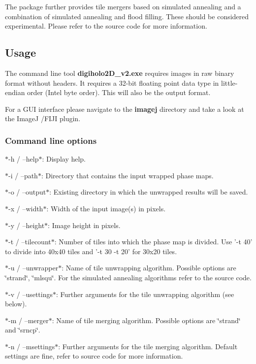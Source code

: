 The package further provides tile mergers based on simulated annealing and a combination of simulated annealing and flood filling. These should be considered experimental. Please refer to the source code for more information.

\subsection*{Usage}

The command line tool {\bfseries digiholo2\-D\-\_\-v2.\-exe} requires images in raw binary format without headers. It requires a 32-\/bit floating point data type in little-\/endian order (Intel byte order). This will also be the output format.

For a G\-U\-I interface please navigate to the {\bfseries imagej} directory and take a look at the Image\-J /\-F\-I\-J\-I plugin.

\subsubsection*{Command line options}


\begin{DoxyItemize}
\item $\ast$-\/h / --help$\ast$\-: Display help.
\item $\ast$-\/i / --path$\ast$\-: Directory that contains the input wrapped phase maps.
\item $\ast$-\/o / --output$\ast$\-: Existing directory in which the unwrapped results will be saved.
\item $\ast$-\/x / --width$\ast$\-: Width of the input image(s) in pixels.
\item $\ast$-\/y / --height$\ast$\-: Image height in pixels.
\item $\ast$-\/t / --tilecount$\ast$\-: Number of tiles into which the phase map is divided. Use '-\/t 40' to divide into 40x40 tiles and '-\/t 30 -\/t 20' for 30x20 tiles.
\item $\ast$-\/u / --unwrapper$\ast$\-: Name of tile unwrapping algorithm. Possible options are \char`\"{}strand\char`\"{}, \char`\"{}mlsqu\char`\"{}. For the simulated annealing algorithms refer to the source code.
\item $\ast$-\/v / --usettings$\ast$\-: Further arguments for the tile unwrapping algorithm (see below).
\item $\ast$-\/m / --merger$\ast$\-: Name of tile merging algorithm. Possible options are \char`\"{}strand\char`\"{} and \char`\"{}srncp\char`\"{}.
\item $\ast$-\/n / --msettings$\ast$\-: Further arguments for the tile merging algorithm. Default settings are fine, refer to source code for more information.
\end{DoxyItemize}

